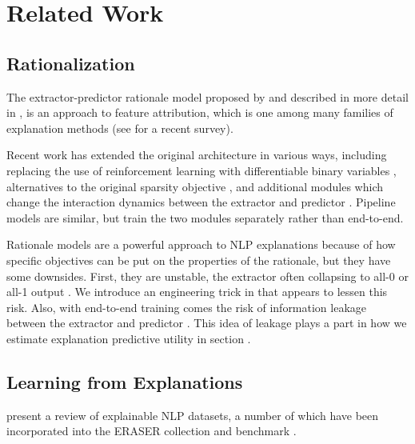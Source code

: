 \section{Related Work}

\subsection{Rationalization}

The extractor-predictor rationale model proposed by \citet{lei_rationalizing_2016} and described in more detail in , is an approach to feature attribution, which is one among many families of explanation methods (see \citet{vilone_explainable_2020} for a recent survey). 


Recent work has extended the original architecture in various ways, including replacing the use of reinforcement learning with differentiable binary variables \cite{bastings_interpretable_2020,deyoung_eraser_2019}, alternatives to the original sparsity objective \cite{paranjape_information_2020, antognini_rationalization_2021}, and additional modules which change the interaction dynamics between the extractor and predictor \cite{carton_extractive_2018, yu_rethinking_2019, chang_invariant_2020}. Pipeline models \cite{lehman_inferring_2019} are similar, but train the two modules separately rather than end-to-end. 

Rationale models are a powerful approach to NLP explanations because of how specific objectives can be put on the properties of the rationale, but they have some downsides. First, they are unstable, the extractor often collapsing to all-0 or all-1 output \cite{deyoung_eraser_2019, yu_rethinking_2019}. We introduce an engineering trick in  that appears to lessen this risk. Also, with end-to-end training comes the risk of information leakage between the extractor and predictor \cite{jethani_have_2021, hase_leakage-adjusted_2020, yu_understanding_2021}. This idea of leakage plays a part in how we estimate explanation predictive utility in section . 



\subsection{Learning from Explanations}

\citet{wiegreffe_teach_2021} present a review of explainable NLP datasets, a number of which have been incorporated into the ERASER collection and benchmark \citep{deyoung_eraser_2019}. 

